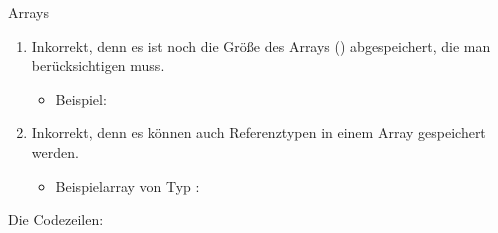 \documentclass{../tuda-exercise}
\begin{document}
\begin{task}[credit=\stars{1}{3}]{Arrays}
\begin{solution}
\begin{enumerate}
        \begin{center}
          Basisadresse + 2 \(\cdot\) Offset
        \end{center}

        Das erste Element befindet sich unter der Basisadresse und das zweite Element unter
        Basiadresse + Offset.

        \begin{figure}[h]
          \centering
          \begin{memory}
          \end{memory}
          \caption{Abstrakte Visualisierung des Speicherplatzes eines Arrays }
        \end{figure}

        \clearpage

        \item Inkorrekt, denn es ist noch die Größe des Arrays ()
        abgespeichert, die man berücksichtigen muss.
        \begin{itemize}
          \item Beispiel:
          
        \end{itemize}
        \item Inkorrekt, denn es können auch Referenztypen in einem Array gespeichert werden.
        \begin{itemize}
          \item Beispielarray von Typ :
          
        \end{itemize}
      \end{enumerate}
      Die Codezeilen:
      

      
    \end{solution}
  \end{task}

  \clearpagesolution
\end{document}
